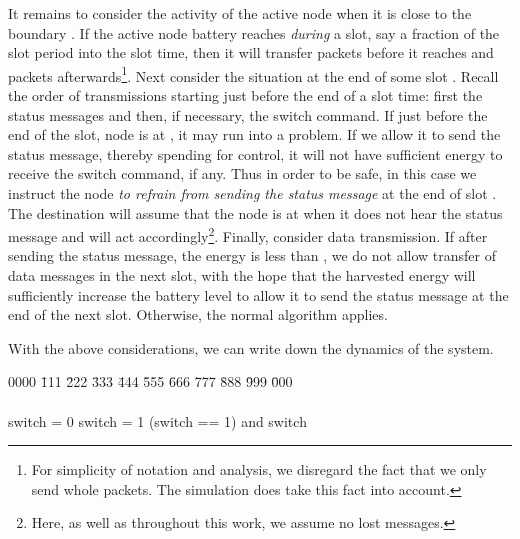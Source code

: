 \documentclass[12 pt]{article}
\newcommand{\debug}[1]{\mbox{\tt #1}}
\renewcommand{\debug}[1]{}              \newcommand{\cmd}[1]{}
\newcommand{\daddcontentsline}[3]{\addcontentsline{#1}{#2}{#3}}
\newcommand{\prntvar}{\verb + itemsep = + \the\itemsep \verb + leftmargin = + \the\leftmargin \verb + leftskip = + \the\leftskip \verb + parindent = + \the\parindent \verb + leftmargini = + \the\leftmargini}
\renewcommand{\prntvar}{}
\begin{document}
It remains to consider the activity of the active node when it is close to the boundary .  If the active node battery reaches  \emph{during} a slot, say a fraction  of the slot period into the slot time, then it will transfer  packets before it reaches   and   packets afterwards\footnote{For simplicity of notation and analysis, we disregard the fact that we only send whole packets.  The simulation does take this fact into account.}.
Next consider the situation at the end of some slot .  Recall the order of transmissions starting just before the end of a slot time: first the status messages and then, if necessary, the switch command.  If just before the end of the slot, node  is at ,  it may run into a problem.  If we allow it to send the status message, thereby spending  for control, it will not have sufficient energy to receive the switch command, if any.  Thus in order to be safe, in this case we instruct the node \emph{to refrain from sending the status message} at the end of slot .  The destination will assume that the node is at  when it does not hear the status message and will act accordingly\footnote{Here, as well as throughout this work, we assume no lost messages.}.
Finally, consider data transmission.  If after sending the status message, the energy is less than , we do not allow transfer of data messages in the next slot, with the hope that the harvested energy will sufficiently increase the battery level to allow it to send the status message at the end of the next slot.  Otherwise, the normal algorithm applies.

With the above considerations, we can write down the dynamics of the system.

\renewcommand{\pname}{B}\daddcontentsline{lot}{table}{\debug{\fbox{\pname}}}



\begin{minipage}{\textwidtha}\setcounter{line}{0}\begin{tabbing}0000\debug{000} \= 111 \= 222 \= 333 \= 444 \= 555 \= 666 \= 777
\= 888 \= 999 \= 000 \kill
\prntvar\\\\
\>switch = 0
\>
\2   switch = 1
\>
\>
\> 
\>\>		
\> 		
\>\>      
\> 
\> (switch == 1)
\2        
\2         and  switch
\2       
\2       
\2       
\>
\2       
\2        
\3            
\3            
\2        
\3            
\3           
\3            
\2        
\>
\end{tabbing}
\end{minipage}
\end{document}
